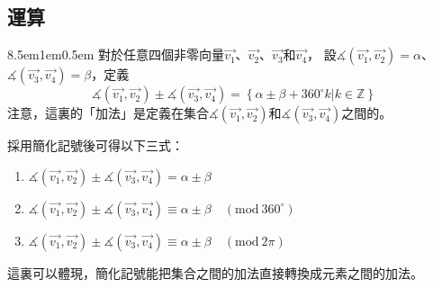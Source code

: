 \documentclass[12pt]{article}
\begin{document}
\subsection{運算}
\begin{mybox}[集合-集合加法]{8.5em}{1em}{0.5em}
    對於任意四個非零向量$\overrightarrow{v_1}$、$\overrightarrow{v_2}$、$\overrightarrow{v_3}$和$\overrightarrow{v_4}$，
    設$\measuredangle{\left(\overrightarrow{v_1},\overrightarrow{v_2}\right)}=\alpha$、$\measuredangle{\left(\overrightarrow{v_3},\overrightarrow{v_4}\right)}=\beta$，定義
    $$
        \measuredangle{\left(\overrightarrow{v_1},\overrightarrow{v_2}\right)}\pm\measuredangle{\left(\overrightarrow{v_3},\overrightarrow{v_4}\right)}
        =\left\{\alpha\pm\beta+360^{\circ}k\left|k\in\mathbb{Z}\right.\right\}
    $$
    注意，這裏的「加法」是定義在集合$\measuredangle{\left(\overrightarrow{v_1},\overrightarrow{v_2}\right)}$和$\measuredangle{\left(\overrightarrow{v_3},\overrightarrow{v_4}\right)}$之間的。
    
    採用簡化記號後可得以下三式：
    \begin{enumerate}
        \item $\measuredangle{\left(\overrightarrow{v_1},\overrightarrow{v_2}\right)}\pm\measuredangle{\left(\overrightarrow{v_3},\overrightarrow{v_4}\right)}=\alpha\pm\beta$
        \item $\measuredangle{\left(\overrightarrow{v_1},\overrightarrow{v_2}\right)}\pm\measuredangle{\left(\overrightarrow{v_3},\overrightarrow{v_4}\right)}\equiv\alpha\pm\beta\quad\left(\text{mod}\ {360^{\circ}}\right)$
        \item $\measuredangle{\left(\overrightarrow{v_1},\overrightarrow{v_2}\right)}\pm\measuredangle{\left(\overrightarrow{v_3},\overrightarrow{v_4}\right)}\equiv\alpha\pm\beta\quad\left(\text{mod}\ {2\pi}\right)$
    \end{enumerate}
    這裏可以體現，簡化記號能把集合之間的加法直接轉換成元素之間的加法。
\end{mybox}
\end{document}
